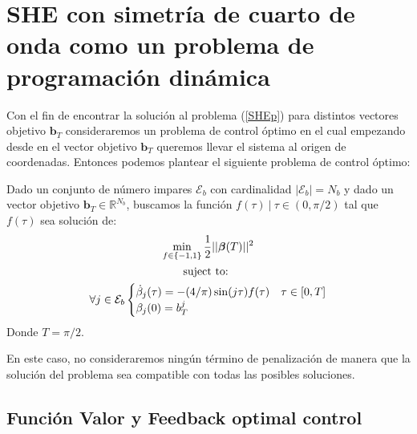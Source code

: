 
\section{SHE con simetría de cuarto de onda como un problema de programación dinámica}

Con el fin de encontrar la solución al problema (\ref{SHEp}) para distintos vectores objetivo $\bm{b}_T$ consideraremos un problema de control óptimo en el cual empezando desde en el vector objetivo $\bm{b}_T$ queremos llevar el sistema al origen de coordenadas. Entonces podemos plantear el siguiente problema de control óptimo:

\begin{problem}\label{OCP_sinL}
    Dado un conjunto de número impares $\mathcal{E}_b$ con cardinalidad $|\mathcal{E}_b| = N_b$ y dado un vector objetivo $\bm{b}_T  \in \mathbb{R}^{N_b}$, buscamos la función $f(\tau ) \ | \ \tau \in (0,\pi/2)$ tal que  $f(\tau)$ sea solución de:
    \begin{gather}
        \min_{f \in \{-1,1\} } \frac{1}{2}|| \bm{\beta}(T)||^2\\
        \notag \text{suject to: } \\
        \notag \forall j \in \mathcal{E}_b
        \begin{cases}
            \dot{\beta}_j(\tau) =  - (4/\pi) \sin(j\tau) f(\tau) & \tau \in [0,T]\label{dyn}\\
            \beta_j(0) = b_T^j
        \end{cases} 
    \end{gather}
    Donde $T=\pi/2$.
\end{problem}

En este caso, no consideraremos ningún término de penalización de manera que la solución del problema sea compatible con todas las posibles soluciones.







\subsection{Función Valor y Feedback optimal control}

